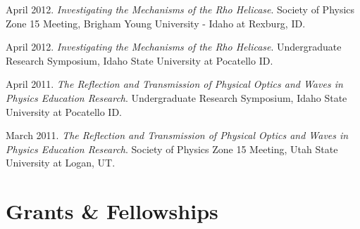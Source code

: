 \documentclass[11pt, letterpaper, roman]{moderncv} %
\begin{document}
\begin{etaremune}[topsep=0pt, itemsep=6pt, partopsep=0pt, parsep=0pt]
  \item April 2012. \textit{Investigating the Mechanisms of the Rho Helicase}. Society of Physics Zone 15 Meeting, Brigham Young University - Idaho at Rexburg, ID.

  \item April 2012. \textit{Investigating the Mechanisms of the Rho Helicase}. Undergraduate Research Symposium, Idaho State University at Pocatello ID.

  \item April 2011. \textit{The Reflection and Transmission of Physical Optics and Waves in Physics Education Research}. Undergraduate Research Symposium, Idaho State University at Pocatello ID.

  \item March 2011. \textit{The Reflection and Transmission of Physical Optics and Waves in Physics Education Research}. Society of Physics Zone 15 Meeting, Utah State University at Logan, UT.
\end{etaremune}

\newpage

\section{Grants \& Fellowships}
    \vspace{2pt}

    \vspace{2pt}
    
\end{document}
